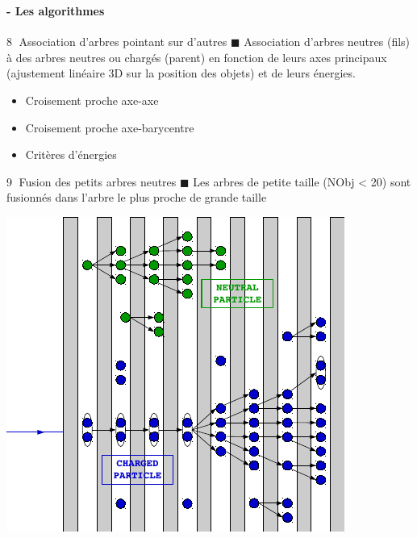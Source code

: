 \documentclass[8pt]{beamer}
\begin{document}
  \begin{frame}
  \frametitle{\secname}
  \framesubtitle{\subsecname - Les algorithmes}
    \begin{minipage}{0.55\linewidth}
      \begin{block}{\textcircled{{\footnotesize 8}} Association d'arbres pointant sur d'autres}
        $\blacksquare$ Association d'arbres neutres (fils) à des arbres neutres ou chargés (parent) en fonction de leurs axes principaux (ajustement linéaire 3D sur la position des objets) et de leurs énergies.
        \begin{itemize}
          \item Croisement proche axe-axe
          \item Croisement proche axe-barycentre
          \item Critères d'énergies
        \end{itemize}
      \end{block}
      \begin{block}{\textcircled{{\footnotesize 9}} Fusion des petits arbres neutres}
        $\blacksquare$ Les arbres de petite taille (NObj < 20) sont fusionnés dans l'arbre le plus proche de grande taille
      \end{block}
    \end{minipage} \hfill
    \begin{minipage}{0.415\linewidth}
      \begin{center}
        \includegraphics[width=\linewidth]{PfoCreation.pdf}

\end{center}
\end{minipage}
\end{frame}
\end{document}
